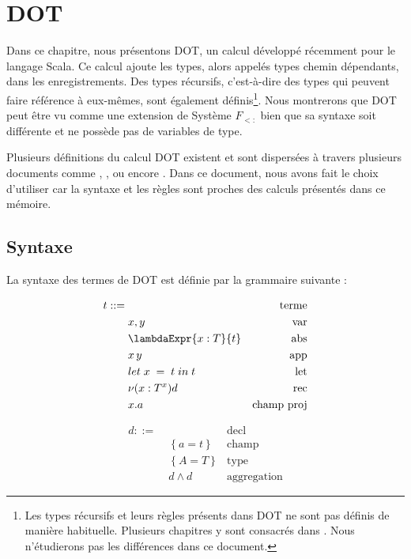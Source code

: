 \chapter{DOT}


Dans ce chapitre, nous présentons DOT, un calcul développé récemment pour le
langage Scala. Ce calcul ajoute les types, alors
appelés types chemin dépendants, dans les enregistrements. Des types
récursifs, c'est-à-dire des types qui peuvent faire référence à eux-mêmes, sont
également définis\footnote{Les types récursifs et leurs règles présents dans DOT ne sont pas
  définis de manière habituelle. Plusieurs chapitres y sont consacrés dans
  \cite{tapl-recursive-types}. Nous n'étudierons pas les différences dans ce document.
}.
Nous montrerons que DOT peut être vu comme une
extension de Système $F_{<:}$ bien que sa syntaxe soit différente et ne possède
pas de variables de type.

Plusieurs définitions du calcul DOT existent et sont dispersées à travers
plusieurs documents comme \cite{nada-amin-thesis}, \cite{OOPSLA-DOT-2016},
\cite{POPL-2017-DOT} ou encore \cite{WF-DOT-2016}. Dans ce document, nous avons
fait le choix d'utiliser \cite{WF-DOT-2016} car la syntaxe et les règles sont
proches des calculs présentés dans ce mémoire.

\section{Syntaxe}

La syntaxe des termes de DOT est définie par la grammaire suivante :
\begin{minipage}{0.45\textwidth}
  \begin{align*}
    t ::= & \, & \text{terme} \\
          & \; x, y & \text{var} \\
          & \; \lambdaExpr{x : T}{t} & \text{abs} \\
          & \; x \, y & \text{app} \\
          & \; \localLetBinding{x}{t}{t} & \text{let} \\
          & \; \nu(x : T^{x})d & \text{rec} \\
          & \; x.a & \text{champ proj} \\
\end{align*}
\end{minipage}
\begin{minipage}{0.45\textwidth}
  \begin{align*}
    d ::= & \, & \text{decl} \\
          & \; \left\{ a = t \right\} & \text{champ} \\
          & \; \left\{ A = T \right\} & \text{type} \\
          & \; d \wedge d & \text{aggregation}
\end{align*}
\end{minipage}

